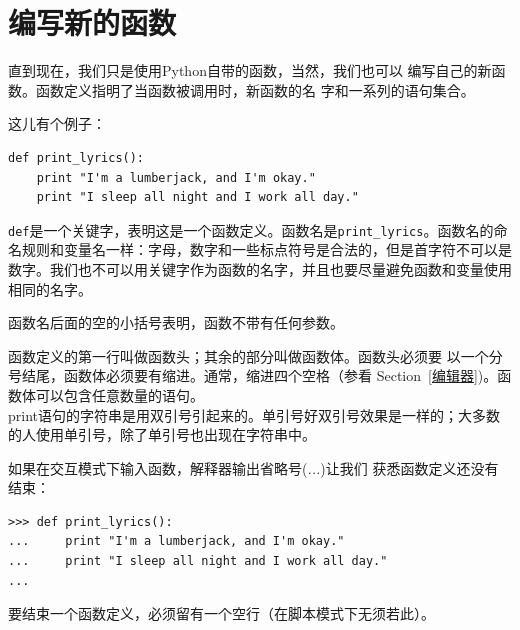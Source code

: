 

\section{编写新的函数}

直到现在，我们只是使用Python自带的函数，当然，我们也可以
编写自己的新函数。函数定义指明了当函数被调用时，新函数的名
字和一系列的语句集合。


这儿有个例子：

\beforeverb
\begin{verbatim}
def print_lyrics():
	print "I'm a lumberjack, and I'm okay."
	print "I sleep all night and I work all day."
\end{verbatim}
\afterverb

{\tt def}是一个关键字，表明这是一个函数定义。函数名是\verb"print_lyrics"。函数名的命名规则和变量名一样：字母，数字和一些标点符号是合法的，但是首字符不可以是数字。我们也不可以用关键字作为函数的名字，并且也要尽量避免函数和变量使用相同的名字。\\


函数名后面的空的小括号表明，函数不带有任何参数。

函数定义的第一行叫做函数头；其余的部分叫做函数体。函数头必须要
以一个分号结尾，函数体必须要有缩进。通常，缩进四个空格（参看 
Section~\ref{编辑器})。函数体可以包含任意数量的语句。\\
	
print语句的字符串是用双引号引起来的。单引号好双引号效果是一样的；大多数的人使用单引号，除了单引号也出现在字符串中。

如果在交互模式下输入函数，解释器输出省略号({\em ...})让我们
获悉函数定义还没有结束：

\beforeverb
\begin{verbatim}
>>> def print_lyrics():
...     print "I'm a lumberjack, and I'm okay."
...     print "I sleep all night and I work all day."
...
\end{verbatim}
\afterverb

要结束一个函数定义，必须留有一个空行（在脚本模式下无须若此）。\\

